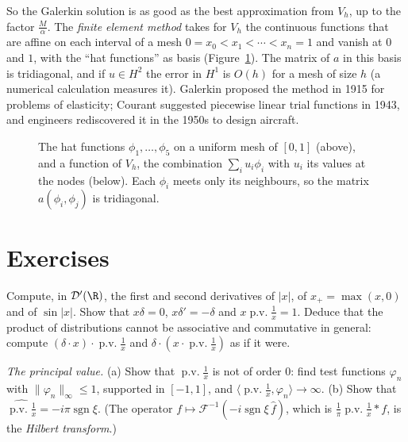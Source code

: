 So the Galerkin solution is as good as the best approximation from $V_h$, up to the factor $\frac M\alpha$. The \emph{finite element method} takes for $V_h$ the continuous functions that are affine on each interval of a
mesh $0=x_0<x_1<\cdots<x_n=1$ and vanish at $0$ and $1$, with the ``hat functions'' as basis (Figure~\ref{fig:hats}). The matrix of $a$ in this basis is tridiagonal, and if $u\in H^2$ the error in $H^1$ is $O(h)$ for a
mesh of size $h$ (a numerical calculation measures it). Galerkin proposed the method in 1915 for problems of elasticity; Courant suggested piecewise linear trial functions in 1943, and engineers rediscovered it in the 1950s
to design aircraft.

\begin{figure}[ht]
\centering
{}
\caption{The hat functions $\phi_1,\dots,\phi_5$ on a uniform mesh of $[0,1]$ (above), and a function of $V_h$, the combination $\sum_iu_i\phi_i$ with $u_i$ its values at the nodes (below). Each $\phi_i$ meets only its
neighbours, so the matrix $a(\phi_i,\phi_j)$ is tridiagonal.}
\label{fig:hats}
\end{figure}

\section{Exercises}

\begin{exercise}[$\star$]\label{ex:derivabs}
Compute, in $\mathcal D'(\R)$, the first and second derivatives of $|x|$, of $x_+=\max(x,0)$ and of $\sin|x|$. Show that $x\delta=0$, $x\delta'=-\delta$ and $x\operatorname{p.v.}\frac1x=1$. Deduce that the product of distributions cannot be
associative and commutative in general: compute $(\delta\cdot x)\cdot\operatorname{p.v.}\frac1x$ and $\delta\cdot(x\cdot\operatorname{p.v.}\frac1x)$ as if it were.
\end{exercise}

\begin{exercise}[$\star\star$]\label{ex:pvorder}
\emph{The principal value.} (a) Show that $\operatorname{p.v.}\frac1x$ is not of order $0$: find test functions $\varphi_n$ with $\|\varphi_n\|_\infty\le1$, supported in $[-1,1]$, and $\langle\operatorname{p.v.}\frac1x,\varphi_n\rangle\to\infty$. (b) Show that
$\widehat{\operatorname{p.v.}\frac1x}=-i\pi\operatorname{sgn}\xi$. (The operator $f\mapsto\mathcal F^{-1}(-i\operatorname{sgn}\xi\,\hat f)$, which is $\frac1\pi\operatorname{p.v.}\frac1x*f$, is the \emph{Hilbert transform}.)
\end{exercise}

